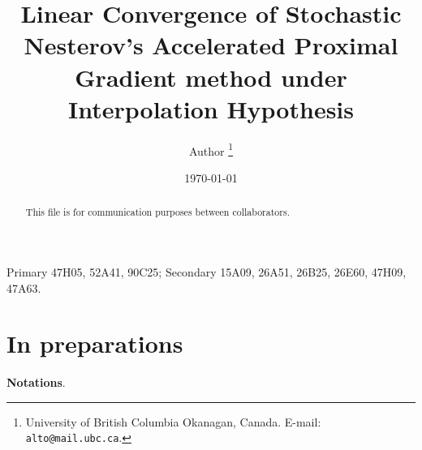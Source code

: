 \documentclass[12pt]{article}
\begin{document}
\title{{\selectfont Linear Convergence of Stochastic Nesterov's Accelerated Proximal Gradient method under Interpolation Hypothesis}}

\author{
    Author
    \thanks{
        University of British Columbia Okanagan,
        Canada. E-mail: \texttt{alto@mail.ubc.ca}.
    }
}

\date{\today}

\maketitle
{}

\begin{abstract} 
    This file is for communication purposes between collaborators. 

\end{abstract}

Primary 47H05, 52A41, 90C25; Secondary 15A09, 26A51, 26B25, 26E60, 47H09, 47A63.


\section{In preparations}
    \textbf{Notations}. 
\end{document}
